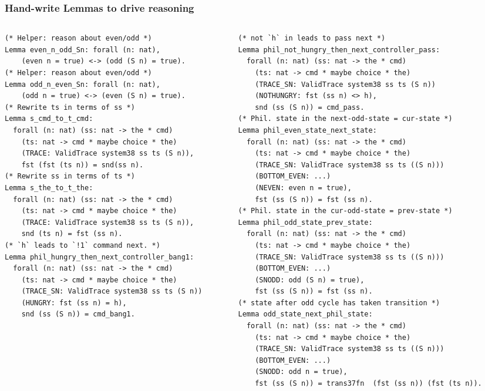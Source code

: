 \documentclass{beamer}
\begin{document}
\begin{frame}[fragile]
\frametitle{Hand-write Lemmas to drive reasoning}

\begin{columns}[T] %
\begin{column}{.48\textwidth}
{\tiny
\begin{verbatim}
(* Helper: reason about even/odd *)
Lemma even_n_odd_Sn: forall (n: nat),
    (even n = true) <-> (odd (S n) = true).
(* Helper: reason about even/odd *)
Lemma odd_n_even_Sn: forall (n: nat),
    (odd n = true) <-> (even (S n) = true).
(* Rewrite ts in terms of ss *)
Lemma s_cmd_to_t_cmd: 
  forall (n: nat) (ss: nat -> the * cmd)
    (ts: nat -> cmd * maybe choice * the)
    (TRACE: ValidTrace system38 ss ts (S n)),
    fst (fst (ts n)) = snd(ss n).
(* Rewrite ss in terms of ts *)
Lemma s_the_to_t_the: 
  forall (n: nat) (ss: nat -> the * cmd)
    (ts: nat -> cmd * maybe choice * the)
    (TRACE: ValidTrace system38 ss ts (S n)),
    snd (ts n) = fst (ss n).
(* `h` leads to `!1` command next. *)
Lemma phil_hungry_then_next_controller_bang1:
  forall (n: nat) (ss: nat -> the * cmd)
    (ts: nat -> cmd * maybe choice * the)
    (TRACE_SN: ValidTrace system38 ss ts (S n))
    (HUNGRY: fst (ss n) = h),
    snd (ss (S n)) = cmd_bang1.
\end{verbatim}
}
\end{column}

\hfill
\begin{column}{.6\textwidth}
{\tiny
\begin{verbatim}
(* not `h` in leads to pass next *)
Lemma phil_not_hungry_then_next_controller_pass:
  forall (n: nat) (ss: nat -> the * cmd)
    (ts: nat -> cmd * maybe choice * the)
    (TRACE_SN: ValidTrace system38 ss ts (S n))
    (NOTHUNGRY: fst (ss n) <> h),
    snd (ss (S n)) = cmd_pass.
(* Phil. state in the next-odd-state = cur-state *)
Lemma phil_even_state_next_state:
  forall (n: nat) (ss: nat -> the * cmd)
    (ts: nat -> cmd * maybe choice * the)
    (TRACE_SN: ValidTrace system38 ss ts ((S n)))
    (BOTTOM_EVEN: ...)
    (NEVEN: even n = true),
    fst (ss (S n)) = fst (ss n).
(* Phil. state in the cur-odd-state = prev-state *)
Lemma phil_odd_state_prev_state:
  forall (n: nat) (ss: nat -> the * cmd)
    (ts: nat -> cmd * maybe choice * the)
    (TRACE_SN: ValidTrace system38 ss ts ((S n)))
    (BOTTOM_EVEN: ...)
    (SNODD: odd (S n) = true),
    fst (ss (S n)) = fst (ss n).
(* state after odd cycle has taken transition *)
Lemma odd_state_next_phil_state:
  forall (n: nat) (ss: nat -> the * cmd)
    (ts: nat -> cmd * maybe choice * the)
    (TRACE_SN: ValidTrace system38 ss ts ((S n)))
    (BOTTOM_EVEN: ...)
    (SNODD: odd n = true),
    fst (ss (S n)) = trans37fn  (fst (ss n)) (fst (ts n)). 
\end{verbatim}
}
\end{column}
\end{columns}
\end{frame}
\end{document}
